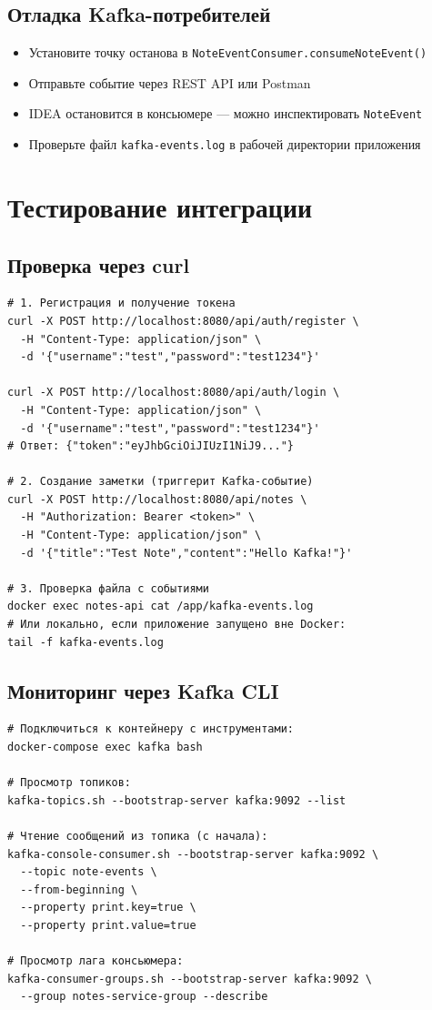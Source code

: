 \documentclass[a4paper,12pt]{article}
\begin{document}
\subsection{Отладка Kafka-потребителей}
\begin{itemize}
    \item Установите точку останова в \texttt{NoteEventConsumer.consumeNoteEvent()}
    \item Отправьте событие через REST API или Postman
    \item IDEA остановится в консьюмере — можно инспектировать \texttt{NoteEvent}
    \item Проверьте файл \texttt{kafka-events.log} в рабочей директории приложения
\end{itemize}

\section{Тестирование интеграции}
\subsection{Проверка через curl}
\begin{lstlisting}[style=yaml,caption=Тестовые запросы]
# 1. Регистрация и получение токена
curl -X POST http://localhost:8080/api/auth/register \
  -H "Content-Type: application/json" \
  -d '{"username":"test","password":"test1234"}'

curl -X POST http://localhost:8080/api/auth/login \
  -H "Content-Type: application/json" \
  -d '{"username":"test","password":"test1234"}'
# Ответ: {"token":"eyJhbGciOiJIUzI1NiJ9..."}

# 2. Создание заметки (триггерит Kafka-событие)
curl -X POST http://localhost:8080/api/notes \
  -H "Authorization: Bearer <token>" \
  -H "Content-Type: application/json" \
  -d '{"title":"Test Note","content":"Hello Kafka!"}'

# 3. Проверка файла с событиями
docker exec notes-api cat /app/kafka-events.log
# Или локально, если приложение запущено вне Docker:
tail -f kafka-events.log
\end{lstlisting}

\subsection{Мониторинг через Kafka CLI}
\begin{lstlisting}[style=yaml,caption=Полезные команды для отладки]
# Подключиться к контейнеру с инструментами:
docker-compose exec kafka bash

# Просмотр топиков:
kafka-topics.sh --bootstrap-server kafka:9092 --list

# Чтение сообщений из топика (с начала):
kafka-console-consumer.sh --bootstrap-server kafka:9092 \
  --topic note-events \
  --from-beginning \
  --property print.key=true \
  --property print.value=true

# Просмотр лага консьюмера:
kafka-consumer-groups.sh --bootstrap-server kafka:9092 \
  --group notes-service-group --describe
\end{lstlisting}
\end{document}
